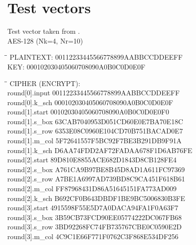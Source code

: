 \chapter{Test vectors}

Test vector taken from \citet[pp. 35--36]{AES:2001}. \\
AES-128 (Nk=4, Nr=10) \\
\begin{tabbing}
  \hspace*{3cm}\=\hspace*{3cm}\= \kill
  PLAINTEXT: \> 00112233445566778899AABBCCDDEEFF \\
  KEY: \> 000102030405060708090A0B0C0D0E0F \\
\end{tabbing}


\begin{tabbing}
  \hspace*{3cm}\=\hspace*{3cm}\= \kill
  CIPHER (ENCRYPT): \\
  round[0].input \> 00112233445566778899AABBCCDDEEFF \\
  round[0].k\_sch \> 000102030405060708090A0B0C0D0E0F \\
  round[1].start \> 00102030405060708090A0B0C0D0E0F0 \\
  round[1].s\_box \> 63CAB7040953D051CD60E0E7BA70E18C \\
  round[1].s\_row \> 6353E08C0960E104CD70B751BACAD0E7 \\
  round[1].m\_col \> 5F72641557F5BC92F7BE3B291DB9F91A \\
  round[1].k\_sch \> D6AA74FDD2AF72FADAA678F1D6AB76FE \\
  round[2].start \> 89D810E8855ACE682D1843D8CB128FE4 \\
  round[2].s\_box \> A761CA9B97BE8B45D8AD1A611FC97369 \\
  round[2].s\_row \> A7BE1A6997AD739BD8C9CA451F618B61 \\
  round[2].m\_col \> FF87968431D86A51645151FA773AD009 \\
  round[2].k\_sch \> B692CF0B643DBDF1BE9BC5006830B3FE \\
  round[3].start \> 4915598F55E5D7A0DACA94FA1F0A63F7 \\
  round[3].s\_box \> 3B59CB73FCD90EE05774222DC067FB68 \\
  round[3].s\_row \> 3BD92268FC74FB735767CBE0C0590E2D \\
  round[3].m\_col \> 4C9C1E66F771F0762C3F868E534DF256 \\

\end{tabbing}
